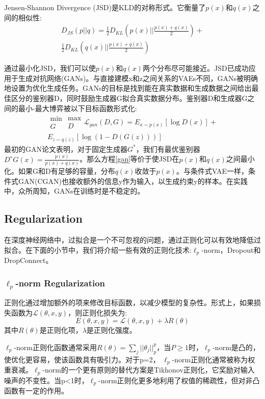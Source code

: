 \documentclass[final]{cvpr}
\begin{document}
Jensen-Shannon Divergence (JSD)是KLD的对称形式。它衡量了$p(x)$和$q(x)$之间的相似性:
\begin{equation}
\begin{split}
	D_{JS}(p||q)=\frac{1}{2}D_{KL}\left(p(x)||\frac{p(x)+q(x)}{2}\right)+\\
	\frac{1}{2}D_{KL}\left(q(x)||\frac{p(x)+q(x)}{2}\right)
\end{split}
\end{equation}

通过最小化JSD，我们可以使$p(x)$和$q(x)$两个分布尽可能接近。JSD已成功应用于生成对抗网络(GANs)。与直接建模x和z之间关系的VAEs不同，GANs被明确地设置为优化生成任务。GANs的目标是找到能在真实数据和生成数据之间给出最佳区分的鉴别器D，同时鼓励生成器G拟合真实数据分布。鉴别器D和生成器G之间的最小-最大博弈被以下目标函数形式化:
\begin{equation}\label{gan}
	\begin{split}
	\substack{\min \\G}\substack{\max \\D}\mathcal{L}_{gan}(D,G)=E_{x\sim p(x)}[\log D(x)]+ \\
	E_{z\sim q(z)}[\log(1-D(G(z)))]
\end{split}
\end{equation}
最初的GAN论文表明，对于固定生成器$G^*$，我们有最优鉴别器$D^∗G(x) =\frac{p(x)}{p(x)+q(x)}$。那么方程\eqref{gan}等价于使JSD在$p(x)$和$q(x)$之间最小化。如果G和D有足够的容量，分布$q(x)$收敛于$p(x)$。与条件式VAE一样，条件式GAN(CGAN)也接收额外的信息y作为输入，以生成约束y的样本。在实践中，众所周知，GANs在训练时是不稳定的。
\subsection{Regularization}
在深度神经网络中，过拟合是一个不可忽视的问题，通过正则化可以有效地降低过拟合。在下面的小节中，我们将介绍一些有效的正则化技术:$\ell_p$-norm，Dropout和DropConnect。
\subsubsection{$\ell_p$-norm Regularization}
正则化通过增加额外的项来修改目标函数，以减少模型的复杂性。形式上，如果损失函数为$\mathcal{L}(\theta,x,y)$，则正则化损失为:
\begin{equation}
	E(\theta,x,y)=\mathcal{L}(\theta,x,y)+\lambda R(\theta)
\end{equation}
其中$R(\theta)$是正则化项，$\lambda$是正则化强度。

$\ell_p$-norm正则化函数通常采用$R(\theta) =\sum_j||\theta_j||_p^p$，当$P\geq1$时，$\ell_p$-norm是凸的，使优化更容易，使该函数具有吸引力。对于p=2， $\ell_p$-norm正则化通常被称为权重衰减。$\ell_p$-norm的一个更有原则的替代方案是Tikhonov正则化，它奖励对输入噪声的不变性。当p<1时，$\ell_p$-norm正则化更多地利用了权值的稀疏性，但对非凸函数有一定的作用。
\end{document}

